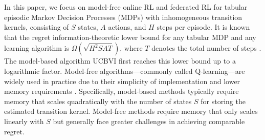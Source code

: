 \documentclass{article}
\begin{document}
In this paper, we focus on model-free online RL and federated RL for tabular episodic Markov Decision Processes (MDPs) with inhomogeneous transition kernels, consisting of $S$ states, $A$ actions, and $H$ steps per episode. It is known that the regret information-theoretic lower bound for any tabular MDP and any learning algorithm is $\Omega(\sqrt{H^2SAT})$, where $T$ denotes the total number of steps \citep{jin2018q}. The model-based algorithm UCBVI \citep{azar2017minimax} first reaches this lower bound up to a logarithmic factor. Model-free algorithms—commonly called Q-learning—are widely used in practice due to their simplicity of implementation and lower memory requirements \citep{jin2018q}. Specifically, model-based methods typically require memory that scales quadratically with the number of states $S$ for storing the estimated transition kernel. Model-free methods require memory that only scales linearly with $S$ but generally face greater challenges in achieving comparable regret.
\end{document}
